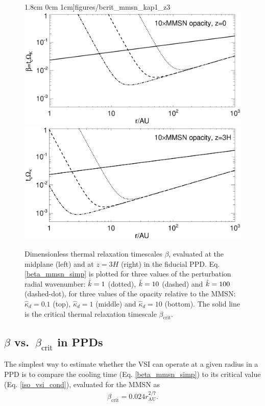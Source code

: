 \begin{figure}
  1.8cm 0cm 1cm]{figures/bcrit_mmsn_kap1_z3}\\
  \includegraphics[scale=.47,clip=true,trim=0cm 0cm 0cm
  1cm]{figures/bcrit_mmsn_kap10_z0}\includegraphics[scale=.47,clip=true,trim=2.5cm 0cm 0cm
  1cm]{figures/bcrit_mmsn_kap10_z3} 
  \caption{Dimensionless thermal relaxation timescales $\beta$,
    evaluated at the midplane (left) and at $z=3H$ (right) in the
    fiducial PPD. Eq. \ref{beta_mmsn_simp} is plotted  
    for three values of the 
    perturbation radial wavenumber: $\hat{k}=1$ (dotted), $\hat{k}=10$
    (dashed) and $\hat{k}=100$ (dashed-dot), for three values of the
    opacity relative to the MMSN: $\hat{\kappa}_d=0.1$ (top),
    $\hat{\kappa}_d=1$ (middle) and $\hat{\kappa}_d=10$ (bottom).  
    The solid line is the 
    critical thermal relaxation timescale $\beta_\mathrm{crit}$.  
    \label{mmsn_bcrit_bcool}}   
\end{figure}  

\subsection{$\beta$ vs.\ $\beta_\mathrm{crit}$ in PPDs}\label{bcritPPD} 
The simplest way to estimate whether the VSI can operate at a given radius in a PPD is to 
compare the cooling time (Eq. \ref{beta_mmsn_simp}) to 
its critical value (Eq. \ref{iso_vsi_cond}), evaluated for the MMSN as    
\begin{align}\label{bcrit_mmsn}
  \beta_\mathrm{crit} = 0.024r_\mathrm{AU}^{2/7}. 
\end{align}

